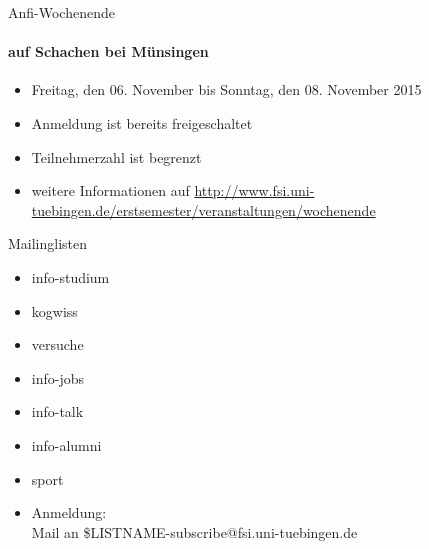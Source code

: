 \documentclass{beamer}
\begin{document}
	\begin{frame}{Anfi-Wochenende}
		\framesubtitle{auf Schachen bei Münsingen}
		\begin{itemize}
			\item Freitag, den 06. November bis Sonntag, den 08. November 2015
			\item Anmeldung ist bereits freigeschaltet
			\item Teilnehmerzahl ist begrenzt
			\item weitere Informationen auf \url{http://www.fsi.uni-tuebingen.de/erstsemester/veranstaltungen/wochenende}
		\end{itemize}
	\end{frame}

	\begin{frame}[<+->]{Mailinglisten}
		\begin{itemize}
			\item info-studium
			\item kogwiss
			\item versuche
			\item info-jobs
			\item info-talk
			\item info-alumni
            \item sport
			\item Anmeldung:\\
				Mail an \$LISTNAME-subscribe@fsi.uni-tuebingen.de
		\end{itemize}
	\end{frame}
\end{document}
